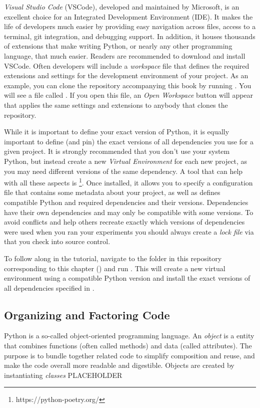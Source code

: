 \textit{Visual Studio Code} (VSCode), developed and maintained by Microsoft, is an excellent choice for an Integrated Development Environment (IDE).
It makes the life of developers much easier by providing easy navigation across files, access to a terminal, git integration, and debugging support.
In addition, it houses thousands of extensions that make writing Python, or nearly any other programming language, that much easier.
Readers are recommended to download and install VSCode.
Often developers will include a \textit{workspace} file that defines the required extensions and settings for the development environment of your project.
As an example, you can clone the repository accompanying this book by running .
You will see a file called . 
If you open this file, an \textit{Open Workspace} button will appear that applies the same settings and extensions to anybody that clones the repository.

While it is important to define your exact version of Python, it is equally important to define (and pin) the exact versions of all dependencies you use for a given project.
It is strongly recommended that you don't use your system Python, but instead create a new \textit{Virtual Environment} for each new project, as you may need different versions of the same dependency. 
A tool that can help with all these aspects is \footnote{https://python-poetry.org/}. 
Once installed, it allows you to specify a  configuration file that contains some metadata about your project, as well as defines compatible Python and required dependencies and their versions.
Dependencies have their own dependencies and may only be compatible with some versions.
To avoid conflicts and help others recreate exactly which versions of dependencies were used when you ran your experiments you should always create a \textit{lock file} via  that you check into source control.

To follow along in the tutorial, navigate to the folder in this repository corresponding to this chapter () and run .
This will create a new virtual environment using a compatible Python version and install the exact versions of all dependencies specified in .

\subsection{Organizing and Factoring Code}
Python is a so-called object-oriented programming language.
An \textit{object} is a entity that combines functions (often called methods) and data (called attributes).
The purpose is to bundle together related code to simplify composition and reuse, and make the code overall more readable and digestible.
Objects are created by instantiating \textit{classes}
PLACEHOLDER

